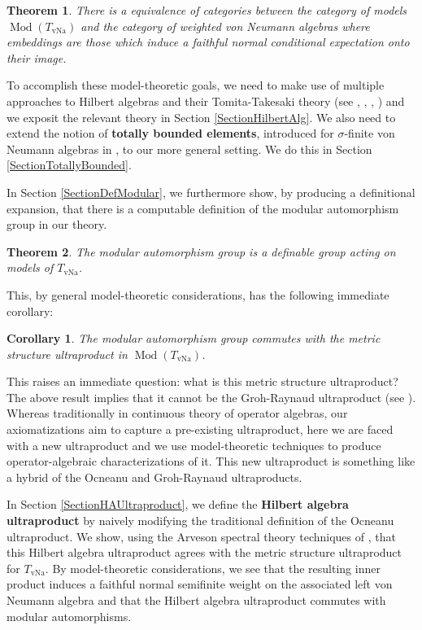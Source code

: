\documentclass[12pt]{amsart}
\newtheorem*{thm*}{Theorem}
\newtheorem*{cor*}{Corollary}
\theoremstyle{definition}
\def \Md{\operatorname{Mod}}
\DeclareMathOperator{\vNa}{vNa}
\begin{document}
\begin{thm*}
    There is a equivalence of categories between the category of models $\Md(T_{\vNa})$ and the category of weighted von Neumann algebras where embeddings are those which induce a faithful normal conditional expectation onto their image.
\end{thm*}

To accomplish these model-theoretic goals, we need to make use of multiple approaches to Hilbert algebras and their Tomita-Takesaki theory (see \cite{Ha75}, \cite{Kad}, \cite{RvD}, \cite{Takesaki}) and we exposit the relevant theory in Section \ref{SectionHilbertAlg}.  We also need to extend the notion of \textbf{totally bounded elements}, introduced for $\sigma$-finite von Neumann algebras in \cite{AGHS}, to our more general setting.  We do this in Section \ref{SectionTotallyBounded}.

In Section \ref{SectionDefModular}, we furthermore show, by producing a definitional expansion, that there is a computable definition of the modular automorphism group in our theory.

\begin{thm*}
    The modular automorphism group is a definable group acting on models of $T_{\vNa}$.  
\end{thm*}

This, by general model-theoretic considerations, has the following immediate corollary:

\begin{cor*}
    The modular automorphism group commutes with the metric structure ultraproduct in $\Md(T_{\vNa})$.
\end{cor*}

This raises an immediate question: what is this metric structure ultraproduct?  The above result implies that it cannot be the Groh-Raynaud ultraproduct (see \cite{AH}).  Whereas traditionally in continuous theory of operator algebras, our axiomatizations aim to capture a pre-existing ultraproduct, here we are faced with a new ultraproduct and we use model-theoretic techniques to produce operator-algebraic characterizations of it.  This new ultraproduct is something like a hybrid of the Ocneanu and Groh-Raynaud ultraproducts.  

In Section \ref{SectionHAUltraproduct}, we define the \textbf{Hilbert algebra ultraproduct} by naively modifying the traditional definition of the Ocneanu ultraproduct.  We show, using the Arveson spectral theory techniques of \cite{AH}, that this Hilbert algebra ultraproduct agrees with the metric structure ultraproduct for $T_{\vNa}$.  By model-theoretic considerations, we see that the resulting inner product induces a faithful normal semifinite weight on the associated left von Neumann algebra and that the Hilbert algebra ultraproduct commutes with modular automorphisms. 
\end{document}
